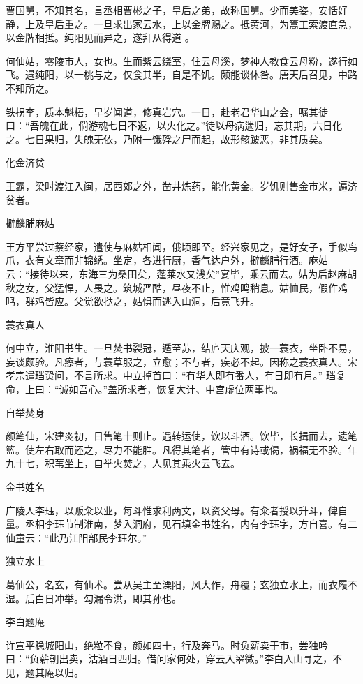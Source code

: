 \documentclass[a4paper,12pt,UTF8,twoside]{ctexbook}
\begin{document}
    曹国舅，不知其名，言丞相曹彬之子，皇后之弟，故称国舅。少而美姿，安恬好静，上及皇后重之。一旦求出家云水，上以金牌赐之。抵黄河，为篙工索渡直急，以金牌相抵。纯阳见而异之，遂拜从得道 。
    
    何仙姑，零陵市人，女也。生而紫云绕室，住云母溪，梦神人教食云母粉，遂行如飞。遇纯阳，以一桃与之，仅食其半，自是不饥。颇能谈休咎。唐天后召见，中路不知所之。
    
    铁拐李，质本魁梧，早岁闻道，修真岩穴。一日，赴老君华山之会，嘱其徒曰：“吾魄在此，倘游魂七日不返，以火化之。”徒以母病遄归，忘其期，六日化之。七日果归，失魄无依，乃附一饿殍之尸而起，故形骸跛恶，非其质矣。
    
    化金济贫
    
    王霸，梁时渡江入闽，居西郊之外，凿井炼药，能化黄金。岁饥则售金市米，遍济贫者。
    
    擗麟脯麻姑
    
    王方平尝过蔡经家，遣使与麻姑相闻，俄顷即至。经兴家见之，是好女子，手似鸟爪，衣有文章而非锦绣。坐定，各进行厨，香气达户外，擗麟脯行酒。麻姑云：“接待以来，东海三为桑田矣，蓬莱水又浅矣”宴毕，乘云而去。姑为后赵麻胡秋之女，父猛悍，人畏之。筑城严酷，昼夜不止，惟鸡鸣稍息。姑恤民，假作鸡鸣，群鸡皆应。父觉欲挞之，姑惧而逃入山洞，后竟飞升。
    
    蓑衣真人
    
    何中立，淮阳书生。一旦焚书裂冠，遁至苏，结庐天庆观，披一蓑衣，坐卧不易，妄谈颇验。凡瘵者，与蓑草服之，立愈；不与者，疾必不起。因称之蓑衣真人。宋孝宗遣珰贽问，不言所求。中立掉首曰：“有华人即有番人，有日即有月。” 珰复命，上曰：“诚如吾心。”盖所求者，恢复大计、中宫虚位两事也。
    
    自举焚身
    
    颜笔仙，宋建炎初，日售笔十则止。遇转运使，饮以斗酒。饮毕，长揖而去，遗笔篮。使左右取而还之，尽力不能胜。凡得其笔者，管中有诗或偈，祸福无不验。年九十七，积苇坐上，自举火焚之，人见其乘火云飞去。
    
    金书姓名
    
    广陵人李珏，以贩籴以业，每斗惟求利两文，以资父母。有籴者授以升斗，俾自量。丞相李珏节制淮南，梦入洞府，见石填金书姓名，内有李珏字，方自喜。有二仙童云：“此乃江阳部民李珏尔。”
    
    独立水上
    
    葛仙公，名玄，有仙术。尝从吴主至溧阳，风大作，舟覆；玄独立水上，而衣履不湿。后白日冲举。勾漏令洪，即其孙也。
    
    李白题庵
    
    许宣平稳城阳山，绝粒不食，颜如四十，行及奔马。时负薪卖于市，尝独吟曰：“负薪朝出卖，沽酒日西归。借问家何处，穿云入翠微。”李白入山寻之，不见，题其庵以归。
    
\end{document}
